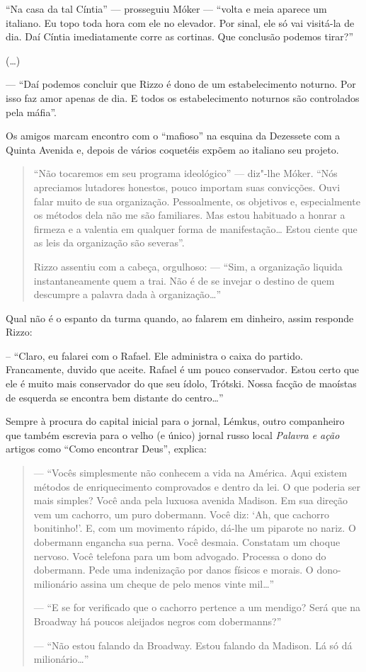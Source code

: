 ``Na casa da tal Cíntia'' --- prosseguiu Móker --- ``volta e meia aparece um italiano. Eu topo toda hora com ele no elevador. Por sinal, ele só vai visitá-la de dia. Daí Cíntia imediatamente corre as cortinas. Que conclusão podemos tirar?''

(\ldots{})

--- ``Daí podemos concluir que Rizzo é dono de um estabelecimento noturno. Por isso faz amor apenas de dia. E todos os estabelecimento noturnos são controlados pela máfia''.

Os amigos marcam encontro com o ``mafioso'' na esquina da Dezessete com a Quinta Avenida e, depois de vários coquetéis expõem ao italiano seu projeto.

\begin{quote}
``Não tocaremos em seu programa ideológico'' --- diz"-lhe Móker. ``Nós apreciamos lutadores honestos, pouco importam suas convicções. Ouvi falar muito de sua organização. Pessoalmente, os objetivos e, especialmente os métodos dela não me são familiares. Mas estou habituado a honrar a firmeza e a valentia em qualquer forma de manifestação\ldots{} Estou ciente que as leis da organização são severas''.

Rizzo assentiu com a cabeça, orgulhoso: --- ``Sim, a organização liquida instantaneamente quem a trai. Não é de se invejar o destino de quem descumpre a palavra dada à organização\ldots{}''
\end{quote}

Qual não é o espanto da turma quando, ao falarem em dinheiro, assim responde Rizzo:

-- ``Claro, eu falarei com o Rafael. Ele administra o caixa do partido. Francamente, duvido que aceite. Rafael é um pouco conservador. Estou certo que ele é muito mais conservador do que seu ídolo, Trótski. Nossa facção de maoístas de esquerda se encontra bem distante do centro\ldots{}''

Sempre à procura do capital inicial para o jornal, Lémkus, outro companheiro que também escrevia para o velho (e único) jornal russo local \emph{Palavra e ação} artigos como ``Como encontrar Deus'', explica:

\begin{quote}
--- ``Vocês simplesmente não conhecem a vida na América. Aqui existem métodos de enriquecimento comprovados e dentro da lei. O que poderia ser mais simples? Você anda pela luxuosa avenida Madison. Em sua direção vem um cachorro, um puro dobermann. Você diz: `Ah, que cachorro bonitinho!'. E, com um movimento rápido, dá-lhe um piparote no nariz. O dobermann engancha sua perna. Você desmaia. Constatam um choque nervoso. Você telefona para um bom advogado. Processa o dono do dobermann. Pede uma indenização por danos físicos e morais. O dono-milionário assina um cheque de pelo menos vinte mil\ldots{}''

--- ``E se for verificado que o cachorro pertence a um mendigo? Será que na Broadway há poucos aleijados negros com dobermanns?''

--- ``Não estou falando da Broadway. Estou falando da Madison. Lá só dá milionário\ldots{}''
\end{quote}

